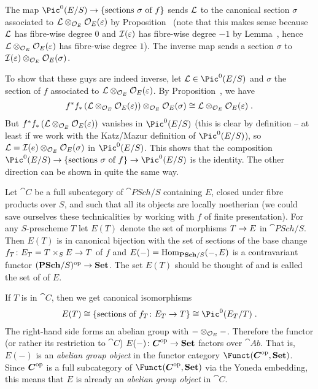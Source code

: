 \documentclass[a4paper,parskip=half,numbers=enddot, DIV=12]{scrreprt}
\begin{document}
	The map $\Pic^0(E/S)\morphism\{\text{sections }\sigma\text{ of }f\}$ sends $\mathcal{L}$ to the canonical section $\sigma$ associated to $\mathcal{L}\otimes_{\mathcal{O}_E}\mathcal{O}_E(\varepsilon)$ by Proposition~ (note that this makes sense because $\mathcal{L}$ has fibre-wise degree $0$ and $\mathcal{I}(\varepsilon)$ has fibre-wise degree $-1$ by Lemma~, hence $\mathcal{L}\otimes_{\mathcal{O}_E}\mathcal{O}_E(\varepsilon)$ has fibre-wise degree $1$). The inverse map sends a section $\sigma$ to $\mathcal{I}(\varepsilon)\otimes_{\mathcal{O}_E}\mathcal{O}_E(\sigma)$.
	
	To show that these guys are indeed inverse, let $\Ll\in\Pic^0(E/S)$ and $\sigma$ the section of $f$ associated to $\mathcal{L}\otimes_{\mathcal{O}_E}\mathcal{O}_E(\varepsilon)$. By Proposition~, we have
	\begin{align*}
		f^*f_*\left(\mathcal{L}\otimes_{\mathcal{O}_E}\mathcal{O}_E(\varepsilon)\right)\otimes_{\mathcal{O}_E}\mathcal{O}_E(\sigma)\cong\mathcal{L}\otimes_{\mathcal{O}_E}\mathcal{O}_E(\varepsilon)\;.
	\end{align*}
	But $f^*f_*\left(\mathcal{L}\otimes_{\mathcal{O}_E}\mathcal{O}_E(\varepsilon)\right)$ vanishes in $\Pic^0(E/S)$ (this is clear by definition -- at least if we work with the Katz/Mazur definition of $\Pic^0(E/S)$), so $\mathcal{L}=\mathcal{I}(e)\otimes_{\mathcal{O}_E}\mathcal{O}_E(\sigma)$ in $\Pic^0(E/S)$. This shows that the composition $\Pic^0(E/S)\morphism\{\text{sections }\sigma\text{ of }f\}\morphism\Pic^0(E/S)$ is the identity. The other direction can be shown in quite the same way.
	
	Let $\cat C$ be a full subcategory of $\cat{PSch}/S$ containing $E$, closed under fibre products over $S$, and such that all its objects are locally noetherian (we could save ourselves these technicalities by working with $f$ of finite presentation). For any $S$-prescheme $T$ let $E(T)$ denote the set of morphisms $T\morphism E$ in $\cat{PSch}/S$. Then $E(T)$ is in canonical bijection with the set of sections of the base change $f_T\colon E_T=T\times_SE\morphism T$ of $f$ and $E(-)=\Hom_{\cat{PSch}/S}(-,E)$ is a contravariant functor $(\cat{PSch}/S)^\op\morphism\cat{Set}$. The set $E(T)$ should be thought of and is called the set of  of $E$.
	
	If $T$ is in $\cat C$, then we get canonical isomorphisms
	\begin{align*}
		E(T)\cong\left\{\text{sections of }f_T\colon E_T\to T\right\}\cong\Pic^0(E_T/T)\;.
	\end{align*}
	The right-hand side forms an abelian group with $-\otimes_{\mathcal{O}_E}-$. Therefore the functor (or rather its restriction to $\cat C$) $E(-)\colon \cat C^\op\morphism\cat{Set}$ factors over $\cat{Ab}$. That is, $E(-)$ is an \emph{abelian group object} in the functor category $\Funct(\cat{C}^\op,\cat{Set})$. Since $\cat C^\op$ is a full subcategory of $\Funct(\cat{C}^\op,\cat{Set})$ via the Yoneda embedding, this means that $E$ is already an \emph{abelian group object} in $\cat C$.
	
\end{document}
